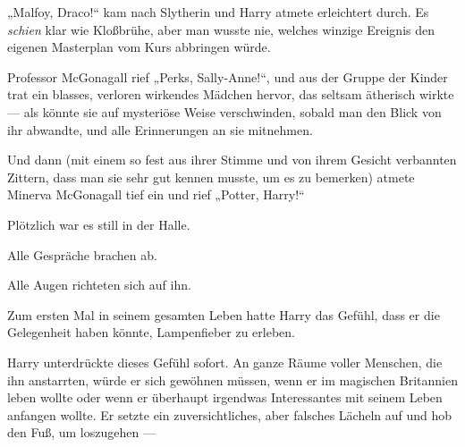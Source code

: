 „Malfoy, Draco!“ kam nach Slytherin und Harry atmete erleichtert durch. Es \emph{schien} klar wie Kloßbrühe, aber man wusste nie, welches winzige Ereignis den eigenen Masterplan vom Kurs abbringen würde.

Professor McGonagall rief
„Perks, Sally-Anne!“, und aus der Gruppe der Kinder trat ein blasses, verloren wirkendes Mädchen hervor, das seltsam ätherisch wirkte — als könnte sie auf mysteriöse Weise verschwinden, sobald man den Blick von ihr abwandte, und alle Erinnerungen an sie mitnehmen.

Und dann (mit einem so fest aus ihrer Stimme und von ihrem Gesicht verbannten Zittern, dass man sie sehr gut kennen musste, um es zu bemerken) atmete Minerva McGonagall tief ein und rief
„Potter, Harry!“

Plötzlich war es still in der Halle.

Alle Gespräche brachen ab.

Alle Augen richteten sich auf ihn.

Zum ersten Mal in seinem gesamten Leben hatte Harry das Gefühl, dass er die Gelegenheit haben könnte, Lampenfieber zu erleben.


Harry unterdrückte dieses Gefühl sofort. An ganze Räume voller Menschen, die ihn anstarrten, würde er sich gewöhnen müssen, wenn er im magischen Britannien leben wollte oder wenn er überhaupt irgendwas Interessantes mit seinem Leben anfangen wollte. Er setzte ein zuversichtliches, aber falsches Lächeln auf und hob den Fuß, um loszugehen —

